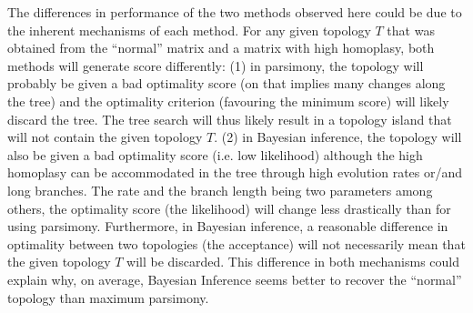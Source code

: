 \documentclass[12pt,letterpaper]{article}
\begin{document}
The differences in performance of the two methods observed here could be due to the inherent mechanisms of each method.
For any given topology $T$ that was obtained from the ``normal'' matrix and a matrix with high homoplasy, both methods will generate score differently:
(1) in parsimony, the topology will probably be given a bad optimality score (on that implies many changes along the tree) and the optimality criterion (favouring the minimum score) will likely discard the tree.
The tree search will thus likely result in a topology island that will not contain the given topology $T$.
(2) in Bayesian inference, the topology will also be given a bad optimality score (i.e. low likelihood) although the high homoplasy can be accommodated in the tree through high evolution rates or/and long branches.
The rate and the branch length being two parameters among others, the optimality score (the likelihood) will change less drastically than for using parsimony.
Furthermore, in Bayesian inference, a reasonable difference in optimality between two topologies (the acceptance) will not necessarily mean that the given topology $T$ will be discarded.
This difference in both mechanisms could explain why, on average, Bayesian Inference seems better to recover the ``normal'' topology than maximum parsimony.
\end{document}

